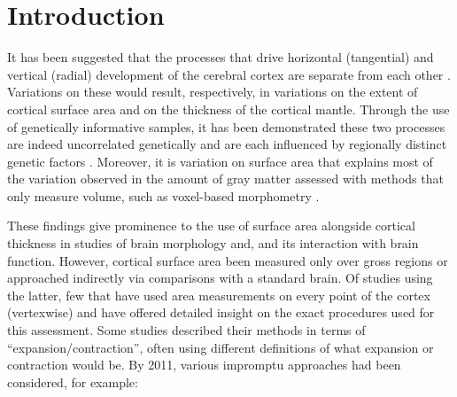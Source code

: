 \chapter{Introduction}
\setstretch{\lspac}

It has been suggested that the processes that drive horizontal (tangential) and vertical (radial) development of the cerebral cortex are separate from each other \citep{Rakic1988}. Variations on these would result, respectively, in variations on the extent of cortical surface area and on the thickness of the cortical mantle. Through the use of genetically informative samples, it has been demonstrated these two processes are indeed uncorrelated genetically \citep{Panizzon2009, Winkler2010} and are each influenced by regionally distinct genetic factors \citep{Schmitt2008,Rimol2010a}. Moreover, it is variation on surface area that explains most of the variation observed in the amount of gray matter assessed with methods that only measure volume, such as voxel-based morphometry \citep{Winkler2010, Rimol2012}.

These findings give prominence to the use of surface area alongside cortical thickness in studies of brain morphology and, and its interaction with brain function. However, cortical surface area been measured only over gross regions or approached indirectly via comparisons with a standard brain. Of studies using the latter, few that have used area measurements on every point of the cortex (vertexwise) and have offered detailed insight on the exact procedures used for this assessment. Some studies described their methods in terms of ``expansion/contraction'', often using different definitions of what expansion or contraction would be. By 2011, various impromptu approaches had been considered, for example:

